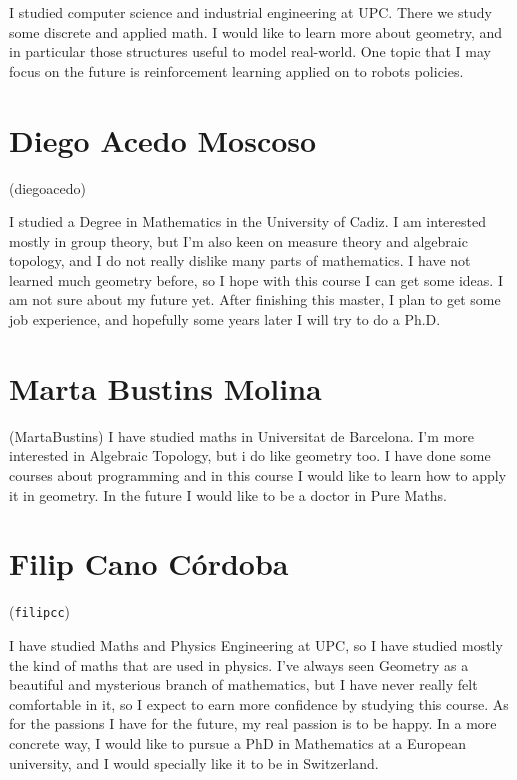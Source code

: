 \documentclass[11pt]{amsart}
\begin{document}
I  studied computer science and industrial engineering at UPC. There we study some discrete and applied math. I would like to learn more about geometry, and in particular those structures useful to model real-world. One topic that I may focus on the future is reinforcement learning applied on to robots policies. 

\section*{Diego Acedo Moscoso}
(diegoacedo)

I studied a Degree in Mathematics in the University of Cadiz. I am interested mostly in group theory, but I'm also keen on measure theory and algebraic topology, and I do not really dislike many parts of mathematics. I have not learned much geometry before, so I hope with this course I can get some ideas.
I am not sure about my future yet. After finishing this master, I plan to get some job experience, and hopefully some years later I will try to do a Ph.D.

\medskip

\section*{Marta Bustins Molina} 
(MartaBustins) 
I have studied maths in Universitat de Barcelona. I'm more interested in Algebraic Topology, but i do like geometry too. I have done some courses about programming and in this course I would like to learn how to apply it in geometry. In the future I would like to be a doctor in Pure Maths.

\medskip

\section*{Filip Cano Córdoba}
(\texttt{filipcc})

I have studied Maths and Physics Engineering at UPC,
so I have studied mostly the kind of maths that are used in physics.
I've always seen Geometry as a beautiful and mysterious branch of mathematics,
but I have never really felt comfortable in it, so I expect to earn more confidence by
studying this course.  
As for the passions I have for the future, 
my real passion is to be happy. 
In a more concrete way, I would like to pursue a PhD in Mathematics at a European 
university, and I would specially like it to be in Switzerland.


\medskip
\end{document}
